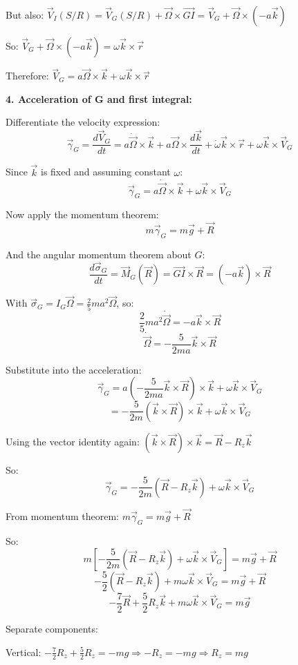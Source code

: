 \documentclass[12pt]{article}
\begin{document}
\begin{correctionbox}
But also: $\vec{V}_I(S/R) = \vec{V}_G(S/R) + \vec{\Omega} \times \vec{GI} = \vec{V}_G + \vec{\Omega} \times (-a\vec{k})$

So: $\vec{V}_G + \vec{\Omega} \times (-a\vec{k}) = \omega\vec{k} \times \vec{r}$

Therefore: $\vec{V}_G = a\vec{\Omega} \times \vec{k} + \omega\vec{k} \times \vec{r}$

\textbf{4. Acceleration of G and first integral:}

Differentiate the velocity expression:
$$\vec{\gamma}_G = \frac{d\vec{V}_G}{dt} = a\dot{\vec{\Omega}} \times \vec{k} + a\vec{\Omega} \times \frac{d\vec{k}}{dt} + \dot{\omega}\vec{k} \times \vec{r} + \omega\vec{k} \times \vec{V}_G$$

Since $\vec{k}$ is fixed and assuming constant $\omega$:
$$\vec{\gamma}_G = a\dot{\vec{\Omega}} \times \vec{k} + \omega\vec{k} \times \vec{V}_G$$

Now apply the momentum theorem:
$$m\vec{\gamma}_G = m\vec{g} + \vec{R}$$

And the angular momentum theorem about $G$:
$$\frac{d\vec{\sigma}_G}{dt} = \vec{M}_G(\vec{R}) = \vec{GI} \times \vec{R} = (-a\vec{k}) \times \vec{R}$$

With $\vec{\sigma}_G = I_G\vec{\Omega} = \frac{2}{5}ma^2\vec{\Omega}$, so:
$$\frac{2}{5}ma^2\dot{\vec{\Omega}} = -a\vec{k} \times \vec{R}$$
$$\dot{\vec{\Omega}} = -\frac{5}{2ma}\vec{k} \times \vec{R}$$

Substitute into the acceleration:
$$\vec{\gamma}_G = a\left(-\frac{5}{2ma}\vec{k} \times \vec{R}\right) \times \vec{k} + \omega\vec{k} \times \vec{V}_G$$
$$= -\frac{5}{2m}(\vec{k} \times \vec{R}) \times \vec{k} + \omega\vec{k} \times \vec{V}_G$$

Using the vector identity again: $(\vec{k} \times \vec{R}) \times \vec{k} = \vec{R} - R_z\vec{k}$

So:
$$\vec{\gamma}_G = -\frac{5}{2m}(\vec{R} - R_z\vec{k}) + \omega\vec{k} \times \vec{V}_G$$

From momentum theorem: $m\vec{\gamma}_G = m\vec{g} + \vec{R}$

So:
$$m\left[-\frac{5}{2m}(\vec{R} - R_z\vec{k}) + \omega\vec{k} \times \vec{V}_G\right] = m\vec{g} + \vec{R}$$
$$-\frac{5}{2}(\vec{R} - R_z\vec{k}) + m\omega\vec{k} \times \vec{V}_G = m\vec{g} + \vec{R}$$
$$-\frac{7}{2}\vec{R} + \frac{5}{2}R_z\vec{k} + m\omega\vec{k} \times \vec{V}_G = m\vec{g}$$

Separate components:

Vertical: $-\frac{7}{2}R_z + \frac{5}{2}R_z = -mg \Rightarrow -R_z = -mg \Rightarrow R_z = mg$


\end{correctionbox}
\end{document}
